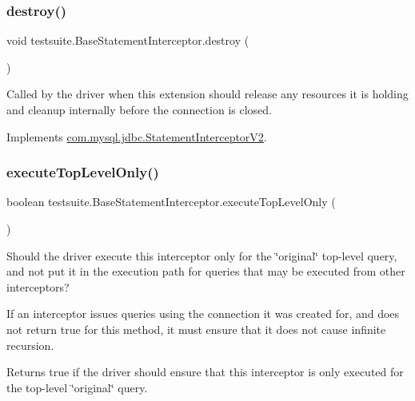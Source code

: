 \subsubsection{\texorpdfstring{destroy()}{destroy()}}
{\footnotesize\ttfamily void testsuite.\+Base\+Statement\+Interceptor.\+destroy (\begin{DoxyParamCaption}{ }\end{DoxyParamCaption})}

Called by the driver when this extension should release any resources it is holding and cleanup internally before the connection is closed. 

Implements \mbox{\hyperlink{interfacecom_1_1mysql_1_1jdbc_1_1_statement_interceptor_v2_a00bfb3d3f7b81e16a9cdf4784150c3f7}{com.\+mysql.\+jdbc.\+Statement\+Interceptor\+V2}}.

\mbox{\label{classtestsuite_1_1_base_statement_interceptor_a1eb3615bcd122817ef160af0a06d7e23}} 
\subsubsection{\texorpdfstring{execute\+Top\+Level\+Only()}{executeTopLevelOnly()}}
{\footnotesize\ttfamily boolean testsuite.\+Base\+Statement\+Interceptor.\+execute\+Top\+Level\+Only (\begin{DoxyParamCaption}{ }\end{DoxyParamCaption})}

Should the driver execute this interceptor only for the \char`\"{}original\char`\"{} top-\/level query, and not put it in the execution path for queries that may be executed from other interceptors?

If an interceptor issues queries using the connection it was created for, and does not return {\ttfamily true} for this method, it must ensure that it does not cause infinite recursion.

\begin{DoxyReturn}{Returns}
true if the driver should ensure that this interceptor is only executed for the top-\/level \char`\"{}original\char`\"{} query. 
\end{DoxyReturn}


